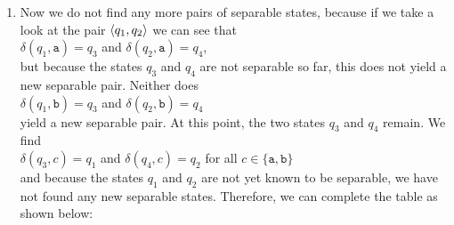 \begin{enumerate}
      \\[0.2cm]
      \hspace*{1.3cm}
      $\delta(q_0,b) = q_2$, \quad $\delta(q_2,b) = q_4$ \quad and \quad $q_2 \not\sim q_4$.
      \\[0.2cm]
      Since we have found in the second step that $q_0 \not\sim q_1$ and $q_0 \not\sim q_2$ hold true, we will insert a $2$ at the corresponding positions in the table. Therefore the table now has the following form:
      \begin{center}        
      \begin{tabular}[t]{|l||l|l|l|l|l|}
      \hline
        & $q_0$      &      $q_1$ &      $q_2$ &      $q_3$ &      $q_4$  \\
      \hline
      \hline
      $q_0$ & $\sim$   &$2$ &$2$ &$1$ &$1$  \\
      \hline
      $q_1$ &$2$ & $\sim$   &          &$1$ &$1$  \\
      \hline
      $q_2$ &$2$ &          & $\sim$   &$1$ &$1$  \\
      \hline
      $q_3$ &$1$ &$1$ &$1$ & $\sim$   &           \\
      \hline
      $q_4$ &$1$ &$1$ &$1$ &          & $\sim$    \\
      \hline
      \end{tabular}
      \end{center}
\item Now we do not find any more pairs of separable states, because if we take a look at the pair $\pair(q_1,q_2)$ we can see that
      \\[0.2cm]
      \hspace*{1.3cm}
      $\delta(q_1,\texttt{a}) = q_3$ \quad and \quad $\delta(q_2,\texttt{a}) = q_4$, 
      \\[0.2cm]
      but because the states $q_3$ and $q_4$ are not separable so far, this does not yield a new
      separable pair.  Neither does 
      \\[0.2cm]
      \hspace*{1.3cm}
      $\delta(q_1,\texttt{b}) = q_3$ \quad and \quad $\delta(q_2,\texttt{b}) = q_4$
      \\[0.2cm]
      yield a new separable pair.  At this point, the two states $q_3$ and $q_4$ remain.  We find
      \\[0.2cm]
      \hspace*{1.3cm}
      $\delta(q_3,c) = q_1$ \quad and \quad $\delta(q_4,c) = q_2$ \quad for all $c \in \{\texttt{a}, \texttt{b}\}$
      \\[0.2cm]
      and because the states $q_1$ and $q_2$ are not yet known to be separable, we have not found any new
      separable states.  Therefore, we can complete the table as shown below:


\end{enumerate}
